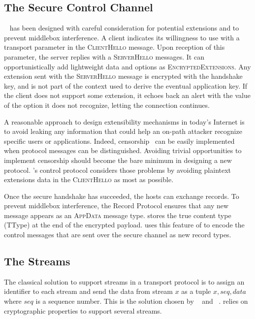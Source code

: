 \subsection{The Secure Control Channel}\label{sec:extending}

~\cite{rfc8446} has been designed with careful consideration for
potential extensions and to prevent middlebox interference. A \tcpls client
indicates its willingness to use \tcpls with a transport parameter in the
\textsc{ClientHello} message. Upon reception of this parameter, the server
replies with a \textsc{ServerHello} messages. It can opportunistically add
lightweight \tcpls data and \tcp options as \textsc{EncryptedExtensions}. Any
extension sent with the \textsc{ServerHello} message is encrypted with the
handshake key, and is not part of the context used to derive the eventual
application key. If the client does not support some extension, it echoes back
an alert with the value of the option it does not recognize, letting the connection
continues.

A reasonable approach to design extensibility mechanisms in today's Internet
is to avoid leaking any information that could help an on-path attacker
recognize specific users or applications. Indeed, censorship~\cite{Morshed2017a,
Gosain2017a,Chai2019a} can be easily implemented when protocol messages can be
distinguished. Avoiding trivial opportunities to implement censorship should
become the bare minimum in designing a new protocol. \tcpls's control protocol
considers those problems by avoiding plaintext extensions data in the
\textsc{ClientHello} as most as possible.

Once the secure handshake has succeeded, the hosts can exchange \tls records.
To prevent middlebox interference, the  Record Protocol ensures that any
new message appears as an \textsc{AppData} message type. \tls stores the true
content type (TType) at the end of the encrypted payload. \tcpls uses this
feature of  to encode the control messages that are sent over the secure
channel as new \tls record types.

\subsection{The \tcpls Streams}\label{sec:datastreams}

The classical solution to support streams in a transport protocol is to assign
an identifier to each stream and send the data from stream $x$ as a tuple
$x,seq,data$ where $seq$ is a sequence number. This is the solution chosen by
\sctp~\cite{rfc4960} and \quic~\cite{draft-ietf-quic-transport}. \tcpls relies
on cryptographic properties to support several streams.

